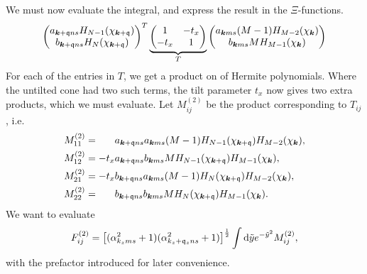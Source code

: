 We must now evaluate the integral, and express the result in the \( \Xi \)-functions.
\[
    \begin{pmatrix}
      a_{\bm{k} + \mathfrak{q} n s} H_{N-1} ( \chi _{\bm{k} + \mathfrak{q}} )\\
      b_{\bm{k} + \mathfrak{q} ns} H_N ( \chi _{\bm{k} + \mathfrak{q}} )
    \end{pmatrix}^{T}
  \underbrace{
    \begin{pmatrix}
      1 & -t_x\\
      -t_x & 1
    \end{pmatrix}
    }_{T}
    \begin{pmatrix}
      a_{\bm{k} m s} (M-1) H_{M-2} (\chi_{\bm{k}})\\
      b_{\bm{k} m s} M H_{M-1} ( \chi _{\bm{k}} )
    \end{pmatrix}
\]
For each of the entries in \( T \), we get a product on of Hermite polynomials.
Where the untilted cone had two such terms, the tilt parameter \( t _x \) now gives two extra products, which we must evaluate.
Let \( M^{(2)}_{ij} \) be the product corresponding to \( T_{ij} \), i.e.
\begin{align}
  M^{(2)}_{11} &= \phantom{-t_x} a_{\bm{k} + \mathfrak{q} ns} a_{\bm{k} ms} (M-1) H_{N-1} (\chi_{\bm{k} + \mathfrak{q}}) H_{M-2} (\chi_{\bm{k}}),\\
  M^{(2)}_{12} &= -t_x a_{\bm{k} + \mathfrak{q} ns} b_{\bm{k} ms} M H_{N-1} (\chi_{\bm{k} + \mathfrak{q}}) H_{M-1} (\chi_{\bm{k}}),\\
  M^{(2)}_{21} &= -t_x b_{\bm{k} + \mathfrak{q} ns} a_{\bm{k} ms} ( M-1 ) H_{N} (\chi_{\bm{k} + \mathfrak{q}}) H_{M-2} (\chi_{\bm{k}}),\\
  M^{(2)}_{22} &= \phantom{-t_x} b_{\bm{k} + \mathfrak{q} ns} b_{\bm{k} ms} M H_N (\chi_{\bm{k} + \mathfrak{q}}) H_{M-1} (\chi_{\bm{k}}).
\end{align}
We want to evaluate
\begin{equation}
  \label{eq:121}
  F^{(2)}_{ij} =
  \left[(\alpha_{k_z m s}^2 + 1) ( \alpha_{k_z + \mathfrak{q}_z n s}^2 + 1 )\right]^{\frac{1}{2}}
  \int \mathrm{d} \tilde{y}
  e^{-\tilde{y}^2}
  M^{(2)}_{ij},
\end{equation}
with the prefactor introduced for later convenience.

